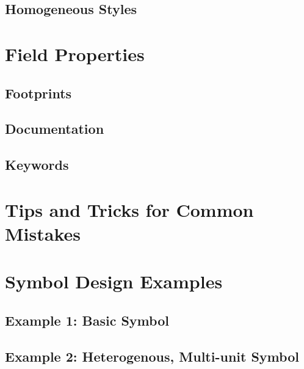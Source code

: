 \subsection{Homogeneous Styles}

\section{Field Properties}
\subsection{Footprints}
\subsection{Documentation}
\subsection{Keywords}

\section{Tips and Tricks for Common Mistakes}

\section{Symbol Design Examples}
\subsection{Example 1: Basic Symbol}
\subsection{Example 2: Heterogenous, Multi-unit Symbol}